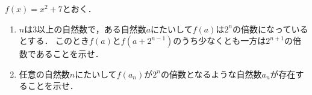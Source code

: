 \documentclass[../../main.tex]{subfiles}
\begin{document}
$f(x)=x^2+7$とおく．
\begin{enumerate}
  \item $n$は3以上の自然数で，ある自然数$a$にたいして$f(a)$は$2^n$の倍数になっているとする．
    このとき$f(a)$と$f(a+2^{n-1})$のうち少なくとも一方は$2^{n+1}$の倍数であることを示せ．
  \item 任意の自然数$n$にたいして$f(a_n)$が$2^n$の倍数となるような自然数$a_n$が存在することを示せ．
\end{enumerate}
\end{document}

